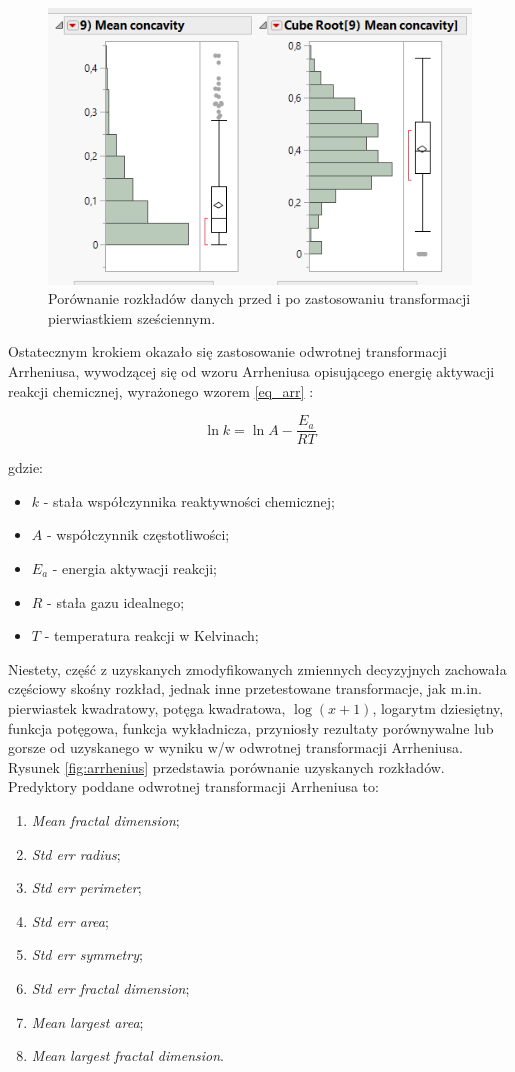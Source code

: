 \begin{figure}[!ht]
	\centering
	\includegraphics[width=0.7\linewidth]{Rysunki/Rozdzial3/cube_root}
	\caption{Porównanie rozkładów danych przed i po zastosowaniu transformacji pierwiastkiem sześciennym.}
	\label{fig:cuberoot}
\end{figure}

	Ostatecznym krokiem okazało się zastosowanie odwrotnej transformacji Arrheniusa, wywodzącej się od wzoru Arrheniusa opisującego energię aktywacji reakcji chemicznej, wyrażonego wzorem \ref{eq_arr} \cite{arr}: 
	
	\begin{equation}
		\ln k = \ln A - \frac{E_a}{RT}
		\label{eq_arr}
	\end{equation}

	gdzie: 
	\begin{itemize}
		\item $k$ - stała współczynnika reaktywności chemicznej;
		\item $A$ - współczynnik częstotliwości;
		\item $E_a$ - energia aktywacji reakcji;
		\item $R$ - stała gazu idealnego;
		\item $T$ - temperatura reakcji w Kelvinach;
	\end{itemize}
	
	Niestety, część z uzyskanych zmodyfikowanych zmiennych decyzyjnych zachowała częściowy skośny rozkład, jednak inne przetestowane transformacje, jak m.in. pierwiastek kwadratowy, potęga kwadratowa, $\log(x+1)$, logarytm dziesiętny, funkcja potęgowa, funkcja wykładnicza, przyniosły rezultaty porównywalne lub gorsze od uzyskanego w wyniku w/w odwrotnej transformacji Arrheniusa. Rysunek \ref{fig:arrhenius} przedstawia porównanie uzyskanych rozkładów. Predyktory poddane odwrotnej transformacji Arrheniusa to:
	
	\begin{enumerate}
		\item \textit{Mean fractal dimension};
		\item \textit{Std err radius};
		\item \textit{Std err perimeter};
		\item \textit{Std err area};
		\item \textit{Std err symmetry};
		\item \textit{Std err fractal dimension};
		\item \textit{Mean largest area};
		\item \textit{Mean largest fractal dimension}.
	\end{enumerate}
	
